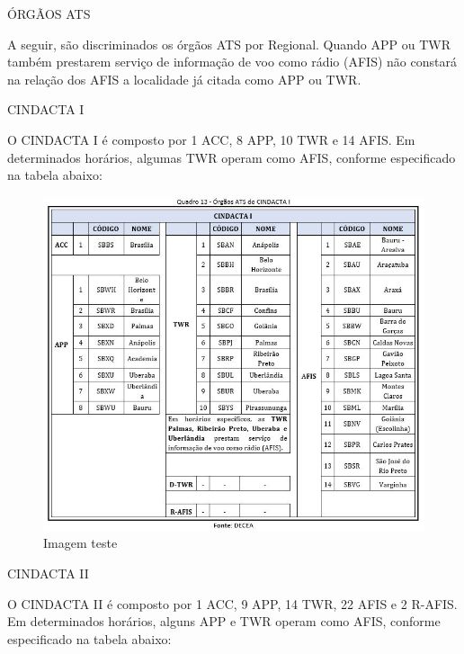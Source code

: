 \documentclass[
]{book}
\begin{document}
ÓRGÃOS ATS

A seguir, são discriminados os órgãos ATS por Regional. Quando APP ou TWR também prestarem serviço de informação de voo como rádio (AFIS) não constará na relação dos AFIS a localidade já citada como APP ou TWR.

CINDACTA I

O CINDACTA I é composto por 1 ACC, 8 APP, 10 TWR e 14 AFIS. Em determinados horários, algumas TWR operam como AFIS, conforme especificado na tabela abaixo:

\begin{figure}
\centering
\includegraphics{imagens/fig91.jpg}
\caption{Imagem teste}
\end{figure}

CINDACTA II

O CINDACTA II é composto por 1 ACC, 9 APP, 14 TWR, 22 AFIS e 2 R-AFIS. Em determinados horários, alguns APP e TWR operam como AFIS, conforme especificado na tabela abaixo:
\end{document}
